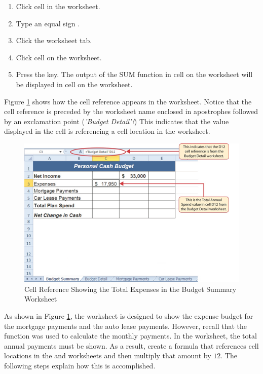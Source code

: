 \begin{enumerate}
	\item Click cell  in the  worksheet.
	\item Type an equal sign \fmtTyping{=}.
	\item Click the  worksheet tab.
	\item Click cell  on the  worksheet.
	\item Press the  key. The output of the SUM function in cell  on the  worksheet will be displayed in cell  on the  worksheet.
\end{enumerate}

Figure \ref{02:fig36} shows how the cell reference appears in the  worksheet. Notice that the cell reference  is preceded by the  worksheet name enclosed in apostrophes followed by an exclamation point (\textit{'Budget Detail'!}) This indicates that the value displayed in the cell is referencing a cell location in the  worksheet.

\begin{figure}[H]
	\centering
	\includegraphics[width=\maxwidth{.95\linewidth}]{gfx/ch02_fig36}
	\caption{Cell Reference Showing the Total Expenses in the Budget Summary Worksheet}
	\label{02:fig36}
\end{figure}

As shown in Figure \ref{02:fig36}, the  worksheet is designed to show the expense budget for the mortgage payments and the auto lease payments. However, recall that the  function was used to calculate the monthly payments. In the  worksheet, the total annual payments must be shown. As a result, create a formula that references cell locations in the  and  worksheets and then multiply that amount by $ 12 $. The following steps explain how this is accomplished.

